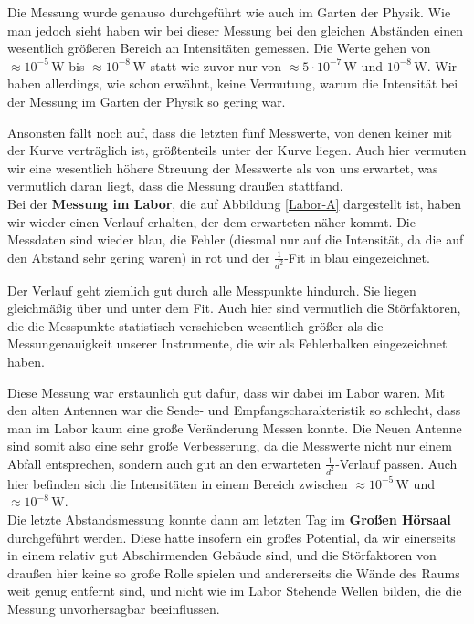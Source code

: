 \documentclass[titlepage,11pt,a4paper,ngerman]{article}
\newcommand{\tx}[1]{\textrm{#1}}
\begin{document}
Die Messung wurde genauso durchgeführt wie auch im Garten der Physik. Wie man jedoch sieht haben wir bei dieser Messung bei den gleichen Abständen einen wesentlich größeren Bereich an Intensitäten gemessen. Die Werte gehen von $ \approx 10^{-5} \, \tx{W} $ bis $ \approx 10^{-8} \, \tx{W} $ statt wie zuvor nur von $ \approx 5 \cdot 10^{-7} \, \tx{W} $ und $ 10^{-8} \, \tx{W} $. Wir haben allerdings, wie schon erwähnt, keine Vermutung, warum die Intensität bei der Messung im Garten der Physik so gering war.\par
Ansonsten fällt noch auf, dass die letzten fünf Messwerte, von denen keiner mit der Kurve verträglich ist, größtenteils unter der Kurve liegen. Auch hier vermuten wir eine wesentlich höhere Streuung der Messwerte als von uns erwartet, was vermutlich daran liegt, dass die Messung draußen stattfand.\\[10pt]
\noindent
Bei der \textbf{Messung im Labor}, die auf Abbildung \ref{Labor-A} dargestellt ist, haben wir wieder einen Verlauf erhalten, der dem erwarteten näher kommt. Die Messdaten sind wieder blau, die Fehler (diesmal nur auf die Intensität, da die auf den Abstand sehr gering waren) in rot und der $ \frac{1}{d^2} $-Fit in blau eingezeichnet.\par
Der Verlauf geht ziemlich gut durch alle Messpunkte hindurch. Sie liegen gleichmäßig über und unter dem Fit. Auch hier sind vermutlich die Störfaktoren, die die Messpunkte statistisch verschieben wesentlich größer als die Messungenauigkeit unserer Instrumente, die wir als Fehlerbalken eingezeichnet haben.\par
Diese Messung war erstaunlich gut dafür, dass wir dabei im Labor waren. Mit den alten Antennen war die Sende- und Empfangscharakteristik so schlecht, dass man im Labor kaum eine große Veränderung Messen konnte. Die Neuen Antenne sind somit also eine sehr große Verbesserung, da die Messwerte nicht nur einem Abfall entsprechen, sondern auch gut an den erwarteten $ \frac{1}{d^2} $-Verlauf passen. Auch hier befinden sich die Intensitäten in einem Bereich zwischen $ \approx 10^{-5} \, \tx{W} $ und $ \approx 10^{-8} \, \tx{W} $.\\[10pt]
\noindent
Die letzte Abstandsmessung konnte dann am letzten Tag im \textbf{Großen Hörsaal} durchgeführt werden. Diese hatte insofern ein großes Potential, da wir einerseits in einem relativ gut Abschirmenden Gebäude sind, und die Störfaktoren von draußen hier keine so große Rolle spielen und andererseits die Wände des Raums weit genug entfernt sind, und nicht wie im Labor Stehende Wellen bilden, die die Messung unvorhersagbar beeinflussen.\par
\end{document}

